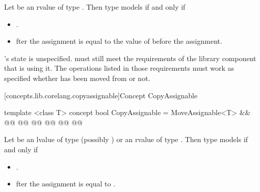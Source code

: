 \begin{addedblock}
\begin{itemdescr}
\pnum
Let  be an rvalue of type 
. Then type  models
 if and only if

\begin{itemize}
\item {}.
\item {}fter the assignment  is equal to the value
of  before the assignment.
\end{itemize}

\pnum
{}'s state is unspecified. \enternote {} must still meet the
requirements of the library component that is using it. The operations listed
in those requirements must work as specified whether  has been moved
from or not.\exitnote
\end{itemdescr}

[concepts.lib.corelang.copyassignable]{Concept CopyAssignable}

%
\begin{itemdecl}
template <class T>
concept bool CopyAssignable =
  MoveAssignable<T> && @@
  @@
    @@
    @@
    @@
  @\newtxt{\};}@
\end{itemdecl}

\begin{itemdescr}
\pnum
Let  be an lvalue of type (possibly
)  or an rvalue of type . Then type  models
 if and only if

\begin{itemize}
\item {}.
\item {}fter the
assignment  is equal to .
\end{itemize}
\end{itemdescr}


\end{addedblock}
